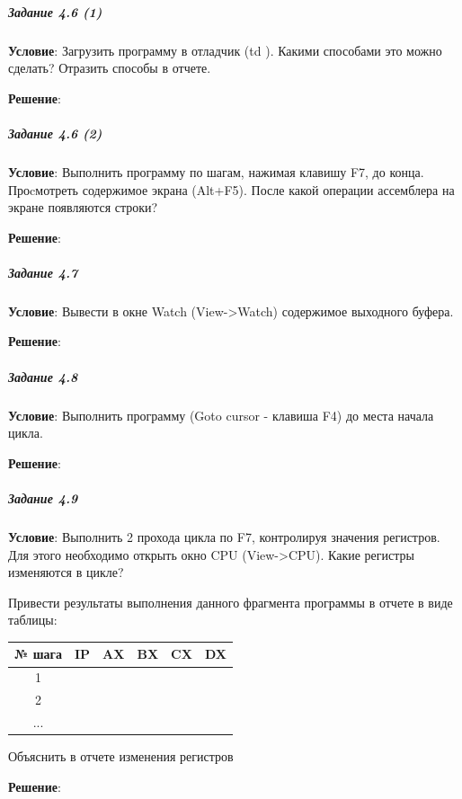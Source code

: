 \subparagraph{Задание 4.6 (1)}

\textbf{Условие}:
Загрузить программу в отладчик (td ). Какими способами это можно сделать? Отразить способы в отчете.

\textbf{Решение}:



\subparagraph{Задание 4.6 (2)}

\textbf{Условие}:
Выполнить программу по шагам, нажимая клавишу F7, до конца. Проcмотреть содержимое экрана (Alt+F5). После какой операции ассемблера на экране появляются строки?
 
\textbf{Решение}:



\subparagraph{Задание 4.7}

\textbf{Условие}:
Вывести в окне Watch (View->Watch) содержимое выходного буфера. 

\textbf{Решение}:



\subparagraph{Задание 4.8}

\textbf{Условие}:
Выполнить программу (Goto cursor - клавиша F4) до места начала цикла. 

\textbf{Решение}:



\subparagraph{Задание 4.9}

\textbf{Условие}:
Выполнить 2 прохода цикла по F7, контролируя значения регистров. Для этого необходимо открыть окно CPU (View->CPU). Какие регистры изменяются в цикле?

Привести результаты выполнения данного фрагмента программы в отчете в виде таблицы:

\begin{table}[!ht]
   \centering

   \begin{tabular}{|c|c|c|c|c|c|} 
      \hline
      № шага  & IP  & AX  & BX  & CX  & DX  \\ \hline
      \hline
      1       &     &     &     &     &     \\ \hline
      2       &     &     &     &     &     \\ \hline
      ...     &     &     &     &     &     \\ \hline
   \end{tabular}
\end{table}

Объяснить в отчете изменения регистров

\textbf{Решение}:



